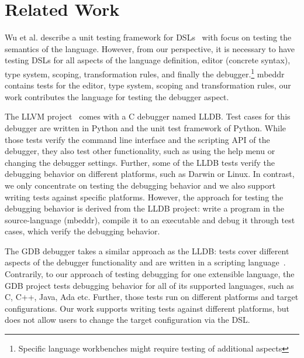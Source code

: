 \section{Related Work}

Wu et al. describe a unit testing framework for 
\acp{DSL}~\cite{DBLP:conf/dsl/WuGM09} with focus on
testing the semantics of the language.  However, from our perspective, it is
necessary to have testing \acp{DSL} for all aspects of the language definition, \eg editor
(concrete syntax), type system, scoping, transformation rules, and finally the
debugger.\footnote{Specific language workbenches might require testing of additional aspects}
mbeddr contains tests for the editor, type system, scoping and transformation
rules, our work contributes the language for testing the debugger aspect.

The \ac{LLVM} project~\cite{LLDB} comes with a C debugger named \ac{LLDB}.
Test cases for this debugger are written in Python
and the unit test framework of Python. While those tests verify the 
command line interface and the scripting \ac{API} of the debugger, they also
test other functionality, such as using the help menu or changing the debugger settings.
Further, some of the \ac{LLDB} tests verify the debugging behavior on different
platforms, such as Darwin or Linux. In contrast, we only concentrate on
testing the debugging behavior and we also support writing tests against
specific platforms. However, the approach for testing the debugging behavior is
derived from the \ac{LLDB} project: write a program in the source-language (mbeddr),
compile it to an executable and debug it through test cases, which verify the
debugging behavior.

The \ac{GDB} debugger takes a similar approach as
the \ac{LLDB}: tests cover different aspects of the debugger
functionality and are written in a scripting language~\cite{gdb}.
Contrarily, to our approach of testing debugging 
for one extensible language, the \ac{GDB} project tests
debugging behavior for all of its supported languages, such as C, C++, Java, Ada
etc. Further, those tests run on different platforms and target
configurations. Our work supports writing tests against different platforms, but
does not allow users to change the target configuration via the \ac{DSL}.
